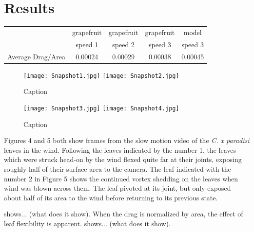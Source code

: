 \section{Results}
\begin{tabular}{ccccc}
      & grapefruit & grapefruit & grapefruit & model \\
      & speed 1 & speed 2 & speed 3 & speed 3 \\
     Average Drag/Area & 0.00024 & 0.00029 & 0.00038 & 0.00045

\end{tabular}
\begin{figure}
    \centering
    \texttt{[image: Snapshot1.jpg]}
    \texttt{[image: Snapshot2.jpg]}
    \caption{Caption}
    \label{fig:results1}
\end{figure}
\begin{figure}
    \centering
    \texttt{[image: Snapshot3.jpg]}
    \texttt{[image: Snapshot4.jpg]}
    \caption{Caption}
    \label{fig:results2}
\end{figure}
	Figures 4 and 5 both show frames from the slow motion video of the \emph{C. x paradisi} leaves in the wind. Following the leaves indicated by the number 1, the leaves which were struck head-on by the wind flexed quite far at their joints, exposing roughly half of their surface area to the camera. The leaf indicated with the number 2 in Figure 5 shows the continued vortex shedding on the leaves when wind was blown across them. The leaf pivoted at its joint, but only exposed about half of its area to the wind before returning to its previous state.

 shows... (what does it show). When the drag is normalized by area, the effect of leaf flexibility is apparent.  shows... (what does it show). 

